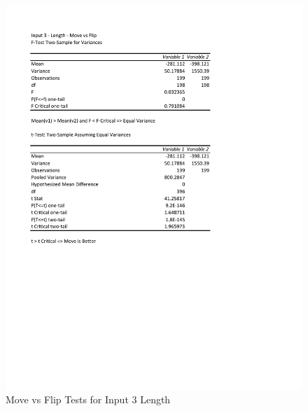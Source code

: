 \documentclass[times]{article}
\begin{document}
		\begin{figure}
		\caption{Move vs Flip Tests for Input 3 Length}
		\label{fig:3mutation}
		\includegraphics[width=\textwidth]{./t_test/3_mutation.pdf}
	\end{figure}
\end{document}
